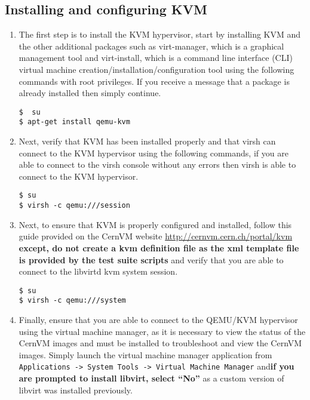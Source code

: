 \subsection{Installing and configuring KVM}
\label{sec:debiankvm}
\begin{enumerate}
\item	The first step is to install the KVM hypervisor, start by installing KVM and the other additional packages such
		as virt-manager, which is a graphical management tool and virt-install, which is a command line interface (CLI)
		virtual machine creation/installation/configuration tool using the following commands with root privileges. If
		you receive a message that a package is already installed then simply continue.

\lstset{language=bash,caption=Installing KVM and Other Related Programs}
\begin{lstlisting}
$  su
$ apt-get install qemu-kvm
\end{lstlisting}

\item	Next, verify that KVM has been installed properly and that virsh can connect to the KVM hypervisor using the
		following commands, if you are able to connect to the virsh console without any errors then virsh is able
		to connect to the KVM hypervisor.

\lstset{language=bash,caption=Verify that virsh can Access KVM}
\begin{lstlisting}
$ su
$ virsh -c qemu:///session
\end{lstlisting}

\item 	Next, to ensure that KVM is properly configured and installed, follow this guide provided on the CernVM website
			\url{http://cernvm.cern.ch/portal/kvm} {\bf except, do not create a kvm definition file as the xml template file
			is provided by the test suite scripts} and verify that you are able to connect to the libvirtd kvm system session.
		
\lstset{language=bash,caption=Verify that KVM is Properly Configured}
\begin{lstlisting}
$ su
$ virsh -c qemu:///system 
\end{lstlisting}

\item	Finally, ensure that you are able to connect to the QEMU/KVM hypervisor using the virtual machine manager, as it 
			is necessary to view the status of the CernVM images and must be installed to troubleshoot and view the CernVM 
			images. Simply launch the virtual machine manager application from 
			\verb|Applications -> System Tools -> Virtual Machine Manager| and{\bf if you are prompted to install libvirt, 
			select ``No'' } as a custom version of libvirt was installed previously.
\end{enumerate}




